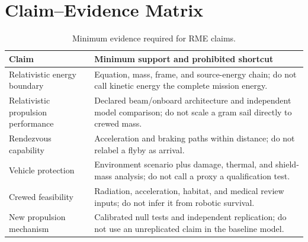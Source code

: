 \documentclass[conference]{../../../../Conference-LaTeX-template_10-17-19/IEEEtran}
\begin{document}
\section{Claim--Evidence Matrix}
\begin{table}[h]
\caption{Minimum evidence required for RME claims.}
\label{tab:claim-evidence}
\centering
\footnotesize
\begin{tabularx}{\columnwidth}{@{}p{}Y@{}}
\toprule
\textbf{Claim} & \textbf{Minimum support and prohibited shortcut} \\
\midrule
Relativistic energy boundary & Equation, mass, frame, and source-energy chain; do not call kinetic energy the complete mission energy. \\
Relativistic propulsion performance & Declared beam/onboard architecture and independent model comparison; do not scale a gram sail directly to crewed mass. \\
Rendezvous capability & Acceleration and braking paths within distance; do not relabel a flyby as arrival. \\
Vehicle protection & Environment scenario plus damage, thermal, and shield-mass analysis; do not call a proxy a qualification test. \\
Crewed feasibility & Radiation, acceleration, habitat, and medical review inputs; do not infer it from robotic survival. \\
New propulsion mechanism & Calibrated null tests and independent replication; do not use an unreplicated claim in the baseline model. \\
\bottomrule
\end{tabularx}
\end{table}
\end{document}
